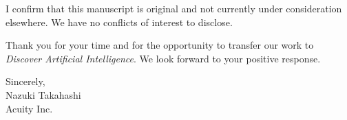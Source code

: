 \documentclass[12pt]{article}
\newcommand{\sendername}{Nazuki Takahashi}
\newcommand{\senderinst}{Acuity Inc.}
\begin{document}
I confirm that this manuscript is original and not currently under consideration elsewhere. We have no conflicts of interest to disclose.

Thank you for your time and for the opportunity to transfer our work to \textit{Discover Artificial Intelligence}. We look forward to your positive response.

\vspace{2em}

\begin{flushleft}
    Sincerely, \\
    \vspace{2em}
    \sendername \\
    \senderinst
\end{flushleft}
\end{document}
